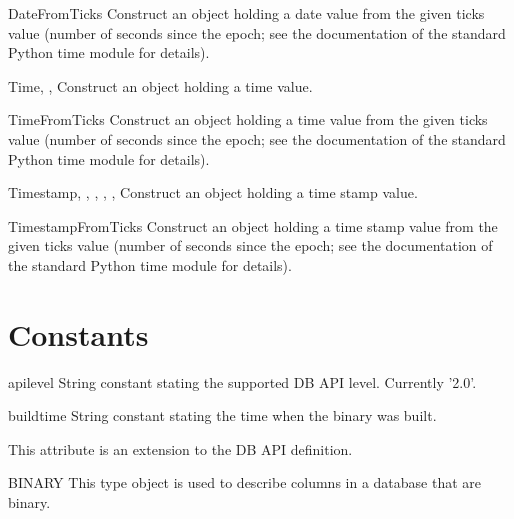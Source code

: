 \documentclass{manual}
\begin{document}
\begin{funcdesc}{DateFromTicks}{}
  Construct an object holding a date value from the given ticks value (number
  of seconds since the epoch; see the documentation of the standard Python
  time module for details).
\end{funcdesc}

\begin{funcdesc}{Time}{, , }
  Construct an object holding a time value.
\end{funcdesc}

\begin{funcdesc}{TimeFromTicks}{}
  Construct an object holding a time value from the given ticks value (number
  of seconds since the epoch; see the documentation of the standard Python
  time module for details).
\end{funcdesc}

\begin{funcdesc}{Timestamp}{, , ,
    , , }
  Construct an object holding a time stamp value.
\end{funcdesc}

\begin{funcdesc}{TimestampFromTicks}{}
  Construct an object holding a time stamp value from the given ticks value
  (number of seconds since the epoch; see the documentation of the standard
  Python time module for details).
\end{funcdesc}

\section{Constants}

\begin{datadesc}{apilevel}
  String constant stating the supported DB API level. Currently '2.0'.
\end{datadesc}

\begin{datadesc}{buildtime}
  String constant stating the time when the binary was built.

   This attribute is an extension to the DB API definition.
\end{datadesc}

\begin{datadesc}{BINARY}
  This type object is used to describe columns in a database that are binary.
\end{datadesc}
\end{document}
